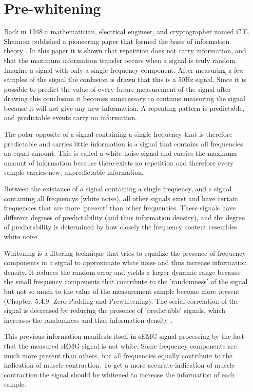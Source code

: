 \section{Pre-whitening}
Back in 1948 a mathematician, electrical engineer, and cryptographer named C.E. Shannon published a pioneering paper that formed the basis of information theory \cite{shannon}. In this paper it is shown that repetition does not carry information, and that the maximum information transfer occurs when a signal is truly random. Imagine a signal with only a single frequency component. After measuring a few samples of the signal the conlusion is drawn that this is a 50Hz signal. Since it is possible to predict the value of every future measurement of the signal after drawing this conclusion it becomes unnecessary to continue measuring the signal because it will not give any new information. A repeating pattern is predictable, and predictable events carry no information.

The polar opposite of a signal containing a single frequency that is therefore predictable and carries little information is a signal that contains all frequencies an equal amount. This is called a white noise signal and carries the maximum amount of information because there exists no repetition and therefore every sample carries new, unpredictable information.

Between the existance of a signal containing a single frequency, and a signal containing all frequencys (white noise), all other signals exist and have certain frequencies that are more 'present' than other frequencies. These signals have different degrees of predictability (and thus information density), and the degree of predictability is determined by how closely the frequency content resembles white noise.

Whitening is a filtering technique that tries to equalize the presence of frequency components in a signal to approximate white noise and thus increase information density. It reduces the random error and yields a larger dynamic range because the small frequency components that contribute to the 'randomness' of the signal but not so much to the value of the measurement sample become more present \cite{time_series_analysis_methods} (Chapter: 5.4.9. Zero-Padding and Prewhitening). The serial correlation of the signal is decreased by reducing the presence of 'predictable' signals, which increases the randomness and thus information density \cite{serial_correlation_definition}. 

This previous information manifests itself in sEMG signal processing by the fact that the measured sEMG signal is not white. Some frequency components are much more present than others, but all frequencies equally contribute to the indication of muscle contraction. To get a more accurate indication of muscle contraction the signal should be whitened to increase the information of each sample.

